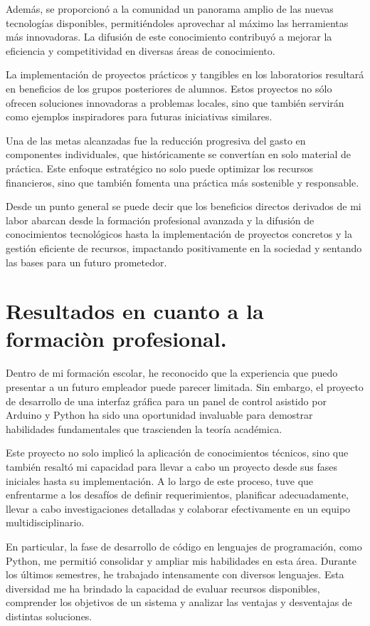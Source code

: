 \documentclass[a4paper,12pt]{article}
\begin{document}
        Además, se proporcionó a la comunidad un panorama amplio de las nuevas tecnologías disponibles, permitiéndoles aprovechar al máximo las herramientas más innovadoras. La difusión de este conocimiento contribuyó a mejorar la eficiencia y competitividad en diversas áreas de conocimiento.

        La implementación de proyectos prácticos y tangibles en los laboratorios resultará en beneficios de los grupos posteriores de alumnos. Estos proyectos no sólo ofrecen soluciones innovadoras a problemas locales, sino que también servirán como ejemplos inspiradores para futuras iniciativas similares.

        Una de las metas alcanzadas fue la reducción progresiva del gasto en componentes individuales, que históricamente se convertían en solo material de práctica. Este enfoque estratégico no solo puede optimizar los recursos financieros, sino que también fomenta una práctica más sostenible y responsable.

        Desde un punto general se puede decir que los beneficios directos derivados de mi labor abarcan desde la formación profesional avanzada y la difusión de conocimientos tecnológicos hasta la implementación de proyectos concretos y la gestión eficiente de recursos, impactando positivamente en la sociedad y sentando las bases para un futuro prometedor.

    \section{Resultados en cuanto a la formaciòn profesional.}
        Dentro de mi formación escolar, he reconocido que la experiencia que puedo presentar a un futuro empleador puede parecer limitada. Sin embargo, el proyecto de desarrollo de una interfaz gráfica para un panel de control asistido por Arduino y Python ha sido una oportunidad invaluable para demostrar habilidades fundamentales que trascienden la teoría académica.

        Este proyecto no solo implicó la aplicación de conocimientos técnicos, sino que también resaltó mi capacidad para llevar a cabo un proyecto desde sus fases iniciales hasta su implementación. A lo largo de este proceso, tuve que enfrentarme a los desafíos de definir requerimientos, planificar adecuadamente, llevar a cabo investigaciones detalladas y colaborar efectivamente en un equipo multidisciplinario.

        En particular, la fase de desarrollo de código en lenguajes de programación, como Python, me permitió consolidar y ampliar mis habilidades en esta área. Durante los últimos semestres, he trabajado intensamente con diversos lenguajes. Esta diversidad me ha brindado la capacidad de evaluar recursos disponibles, comprender los objetivos de un sistema y analizar las ventajas y desventajas de distintas soluciones.
\end{document}
